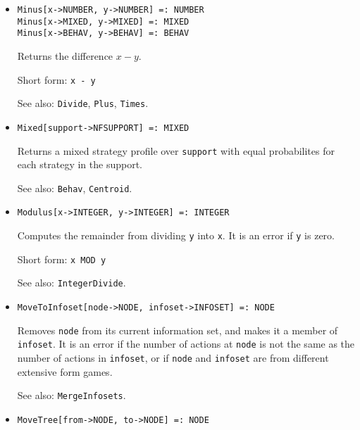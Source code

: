 \begin{itemize}
\item 
\protect \large \begin{verbatim}
Minus[x->NUMBER, y->NUMBER] =: NUMBER 
Minus[x->MIXED, y->MIXED] =: MIXED 
Minus[x->BEHAV, y->BEHAV] =: BEHAV 
\end{verbatim} \normalsize

\bd
Returns the difference $x - y$.
\item [Short form:] \verb+x - y+
\item [See also:] \verb+Divide+, \verb+Plus+, \verb+Times+.
\ed

\item{}
\protect \large \begin{verbatim}
Mixed[support->NFSUPPORT] =: MIXED 
\end{verbatim}\normalsize

\bd
Returns a mixed strategy profile over \verb+support+ with equal
probabilites for each strategy in the support.  
\item [See also:] \verb+Behav+, \verb+Centroid+.
\ed

\item{}
\protect \large \begin{verbatim}
Modulus[x->INTEGER, y->INTEGER] =: INTEGER 
\end{verbatim}\normalsize

\bd
Computes the remainder from dividing \verb+y+ into \verb+x+.  It is an
error if \verb+y+ is zero.
\item [Short form:] \verb+x MOD y+
\item [See also:] \verb+IntegerDivide+.
\ed


\item{}
\protect \large \begin{verbatim}
MoveToInfoset[node->NODE, infoset->INFOSET] =: NODE 
\end{verbatim}\normalsize

\bd
Removes \verb+node+ from its current information set, and makes it a
member of \verb+infoset+. It is an error if the number of actions at
\verb+node+ is not the same as the number of actions in
\verb+infoset+, or if \verb+node+ and \verb+infoset+ are from
different extensive form games.   
\item [See also:] \verb+MergeInfosets+.
\ed


\item{}
\protect \large \begin{verbatim}
MoveTree[from->NODE, to->NODE] =: NODE 
\end{verbatim}\normalsize


\end{itemize}
